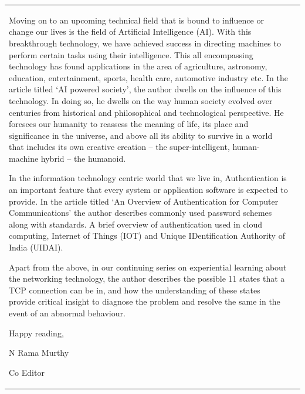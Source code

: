 {\begin{tabular}{p{.2\paperwidth}@{}!{\color{goldan-yellow}\vline width 1.5pt}p{.7\paperwidth}}
\medskip
Moving on to an upcoming technical field that is bound to influence or change our lives is the field of Artificial Intelligence (AI). With this breakthrough technology, we have achieved success in directing machines to perform certain tasks using their intelligence. This all encompassing technology has found applications in the area of agriculture, astronomy, education, entertainment, sports, health care, automotive industry etc.  In the article titled ‘AI powered society’, the author dwells on the influence of this technology. In doing so, he dwells on the way human society evolved over centuries from historical and philosophical and technological perspective.  He foresees our humanity to reassess the meaning of life, its place and significance in the universe, and above all its ability to survive in a world that includes its own creative creation – the super-intelligent, human-machine hybrid – the humanoid.

\medskip
In the information technology centric world that we live in, Authentication is an important feature that every system or application software is expected to provide. In the article titled ‘An Overview of Authentication for Computer Communications’ the author describes commonly used password schemes along with standards. A brief overview of authentication used in cloud computing, Internet of Things (IOT) and Unique IDentification Authority of India (UIDAI).

\medskip
Apart from the above, in our continuing series on experiential learning about the networking technology, the author describes the possible 11 states that a TCP connection can be in, and how the understanding of these states provide critical insight to diagnose the problem and resolve the same in the event of an abnormal behaviour. 

\vskip 3cm


\hfill Happy reading,\hspace{2.1cm}\,

\bigskip

\hfill  N Rama Murthy\hspace{2cm}\,

\hfill Co Editor\hspace{3cm}\,

\end{tabular}
}





